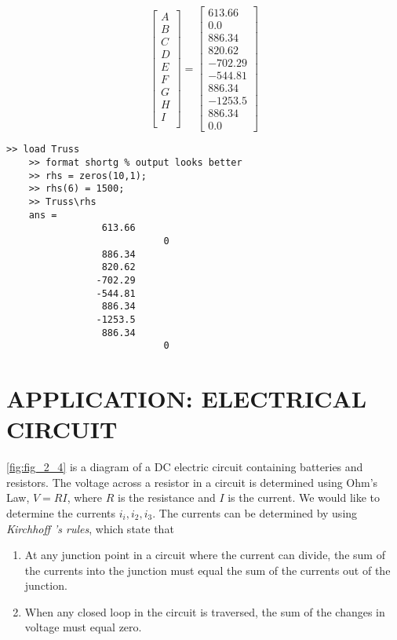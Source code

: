 \documentclass[../main.tex]{subfiles}
\begin{document}
$$
\left[\begin{array}{c}
A \\ B \\ C\\ D\\ E\\ F\\ G\\ H\\ I\\
\end{array}\right] =
\left[ \begin{array}{c}
613.66\\ 0.0\\ 886.34\\ 820.62\\ -702.29\\ -544.81\\
886.34\\ -1253.5 \\886.34 \\0.0
\end{array}\right]
$$

\begin{lstlisting}[numbers=none,frame=none]
	>> load Truss
	>> format shortg % output looks better
	>> rhs = zeros(10,1);
	>> rhs(6) = 1500;
	>> Truss\rhs
	ans =
				 613.66
							0
				 886.34
				 820.62
				-702.29
				-544.81
				 886.34
				-1253.5
				 886.34
							0
\end{lstlisting}



\section[Application: Eletrical Circuit]{APPLICATION: ELECTRICAL CIRCUIT}
\autoref{fig:fig_2_4} is a diagram of a DC electric circuit containing batteries and resistors. The voltage across a resistor in a circuit is determined using Ohm’s Law, $V = RI$, where $R$ is the resistance and $I$ is the current. We would like to determine the currents $i_{i}, i_{2}, i_{3}$. The currents can be determined by using \emph{Kirchhoff ’s rules}, which state that

\begin{enumerate}[noitemsep, label=textbf{\arabic*.}]
	\item At any junction point in a circuit where the current can divide, the sum of the currents into the junction must equal the sum of the currents out of the junction.
	\item  When any closed loop in the circuit is traversed, the sum of the changes in voltage must equal zero.
\end{enumerate}
\end{document}
